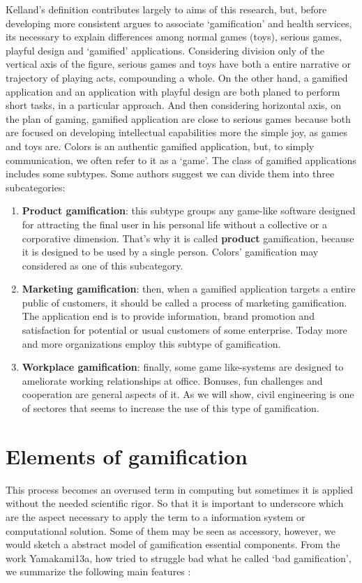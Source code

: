 Kelland's definition contributes largely to aims of this research, but, before developing more consistent argues to associate `gamification' and health services, its necessary to explain differences among normal games (toys), serious games, playful design and `gamified' applications. Considering division only of the vertical axis of the figure, serious games and toys have both a entire narrative or trajectory of playing acts, compounding a whole. On the other hand, a gamified application and an application with playful design are both planed to perform short tasks, in a particular approach. And then considering horizontal axis, on the plan of gaming, gamified application are close to serious games because both are focused on developing intellectual capabilities more the simple joy, as games and toys are.  Colors is an authentic gamified application, but, to simply communication, we often refer to it as a `game'. The class of gamified applications includes some subtypes. Some authors suggest we can divide them into three subcategories:

\begin{enumerate}
	\item \textbf{Product gamification}: this subtype groups any game-like software designed for attracting the final user in his personal life without a collective or a corporative dimension. That's why it is called \textbf{product} gamification, because it is designed to be used by a single person. Colors' gamification may considered as one of this subcategory.
	\item \textbf{Marketing gamification}: then, when a gamified application targets a entire public of customers, it should be called a process of marketing gamification. The application end is to provide information, brand promotion and satisfaction for potential or usual customers of some enterprise. Today more and more organizations employ this subtype of gamification.
	\item \textbf{Workplace gamification}: finally, some game like-systems are designed to ameliorate working relationships at office. Bonuses, fun challenges and cooperation are general aspects of it. As we will show, civil engineering is one of sectores that seems to increase the use of this type of gamification. 
\end{enumerate}

\section{Elements of gamification}
This process becomes an overused term in computing but sometimes it is applied without the needed scientific rigor. So that it is important to underscore which are the aspect necessary to apply the term to a information system or computational solution. Some of them may be seen as accessory, however, we would sketch a abstract model of gamification essential components. From the work Yamakami13a, how tried to struggle bad what he called `bad gamification', we summarize the following main features \citep{conf/mue/Yamakami13a}:

